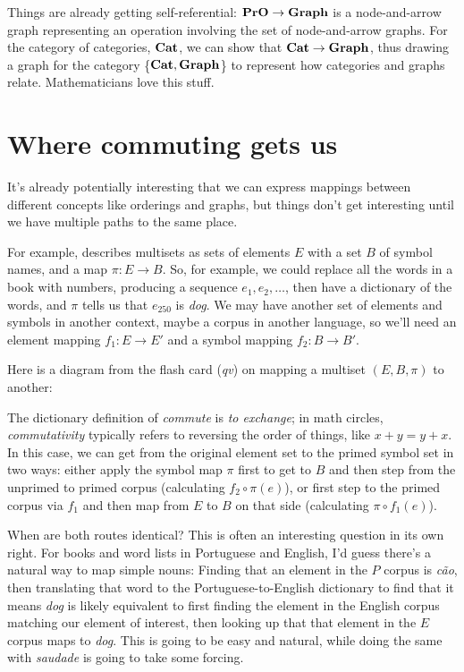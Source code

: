 \documentclass[11pt]{article}
\begin{document}
Things are already getting self-referential: ${\bf PrO}\to {\bf Graph}$ is a node-and-arrow
graph representing an operation involving the set of node-and-arrow graphs. For the 
category of categories, ${\bf Cat}$, we can show that ${\bf Cat}\to {\bf Graph}$, thus
drawing a graph for the category \{${\bf Cat}, {\bf Graph}$\} to represent how categories and graphs relate.
Mathematicians love this stuff.

\section{Where commuting gets us} It's already potentially interesting that we can
express mappings between different concepts like orderings and graphs, but things don't get
interesting until we have multiple paths to the same place.


For example,
\citet{spivak:category} describes multisets as sets of elements $E$ with a set $B$ of
symbol names, and a map $\pi:E\to B$. So, for example, we could replace all the words in a
book with numbers, producing a sequence $e_1, e_2, \dots$, then have a dictionary
of the words, and $\pi$ tells us that $e_{250}$ is {\em dog}. We
may have another set of elements and symbols in another context, maybe a corpus in
another language, so we'll need an element mapping $f_1:E\to E'$ and a symbol mapping
$f_2:B\to B'$.

Here is a diagram
from the flash card ({\em qv}) on mapping a multiset $(E, B, \pi)$ to another:

The dictionary definition of {\em
commute} is {\em to exchange}; in math circles, {\em commutativity} typically refers to
reversing the order of things, like $x+y = y+x$. In this case, we can 
get from the original element set to the primed symbol set in two ways:
either apply the symbol map $\pi$ first to get to $B$ and then step from the unprimed to
primed corpus (calculating $f_2\circ\pi(e)$), or first step to the primed corpus via $f_1$ and then
map from $E$ to $B$ on that side (calculating $\pi\circ f_1(e)$).

When are both routes identical? This is often an interesting question in its own right.
For books and word lists in Portuguese and English, I'd guess there's a natural
way to map simple nouns: Finding that an element in the $P$ corpus is {\em cão},
then translating that word to the Portuguese-to-English dictionary to find that it means {\em dog}
is likely equivalent to first finding the element in the English corpus matching our
element of interest, then looking up that that element in the $E$ corpus maps to {\em
dog}. This is going to be easy and natural, while doing the same with {\em saudade}
is going to take some forcing.
\end{document}

